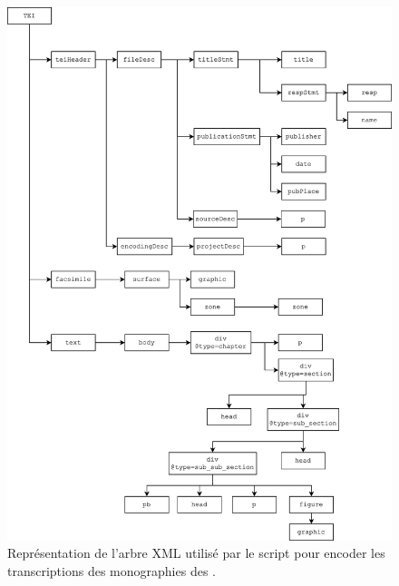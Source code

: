 \begin{figure}
    \centering
    \includegraphics[width=16cm]{img/xml_tree_1.png}
    \caption[Représentation de l'arbre XML des fichiers TEI]{Représentation de l'arbre XML utilisé par le script \lse{} pour encoder les transcriptions des monographies des \odm.}
    \label{fig:xmltree1}
\end{figure}

